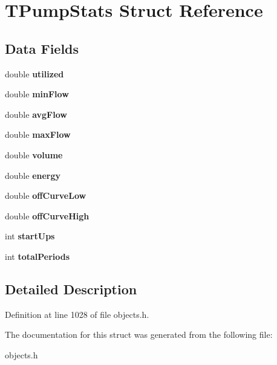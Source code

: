 \hypertarget{struct_t_pump_stats}{}\section{T\+Pump\+Stats Struct Reference}
\label{struct_t_pump_stats}
\subsection*{Data Fields}
\begin{DoxyCompactItemize}
\item 
\mbox{\label{struct_t_pump_stats_ad363d87993e38cf7755220ab18048c9a}} 
double {\bfseries utilized}
\item 
\mbox{\label{struct_t_pump_stats_a327cb8f16165b990005d5d4aa66720e3}} 
double {\bfseries min\+Flow}
\item 
\mbox{\label{struct_t_pump_stats_a77b6f99fc6b2e62a3c492efdaa8dadd3}} 
double {\bfseries avg\+Flow}
\item 
\mbox{\label{struct_t_pump_stats_a50e437bc9d75ebd303d3e48e56416ad3}} 
double {\bfseries max\+Flow}
\item 
\mbox{\label{struct_t_pump_stats_a8eb3ef4958b442309868039dbab6f0bf}} 
double {\bfseries volume}
\item 
\mbox{\label{struct_t_pump_stats_a1d26cc49e49afe96406210d6beaf418a}} 
double {\bfseries energy}
\item 
\mbox{\label{struct_t_pump_stats_ab4a9825466480dd99e2446db39d5cead}} 
double {\bfseries off\+Curve\+Low}
\item 
\mbox{\label{struct_t_pump_stats_a5079827b6c8671f6f532525ae015d209}} 
double {\bfseries off\+Curve\+High}
\item 
\mbox{\label{struct_t_pump_stats_ad2f205c94056409791b0879929249c22}} 
int {\bfseries start\+Ups}
\item 
\mbox{\label{struct_t_pump_stats_af0680eda9c338e25e4879863bd9e063c}} 
int {\bfseries total\+Periods}
\end{DoxyCompactItemize}


\subsection{Detailed Description}


Definition at line 1028 of file objects.\+h.



The documentation for this struct was generated from the following file\+:\begin{DoxyCompactItemize}
\item 
objects.\+h\end{DoxyCompactItemize}

